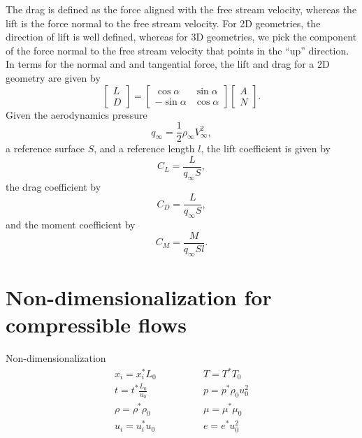 \documentclass[oneside,a4paper,11pt]{report}
\begin{document}
The drag is defined as the force aligned with the free stream velocity, whereas the lift is the force normal to the free stream velocity. For 2D geometries, the direction of lift is well defined, whereas for 3D geometries, we pick the component of the force normal to the free stream velocity that points in the ``up'' direction. In terms for the normal and and tangential force, the lift and drag for a 2D geometry are given by
\begin{equation}
    \begin{bmatrix} L \\ D \end{bmatrix} = 
    \begin{bmatrix} \cos \alpha & \sin \alpha \\ -\sin \alpha & \cos \alpha \end{bmatrix} \begin{bmatrix} A \\ N \end{bmatrix}.
\end{equation}
Given the aerodynamics pressure
\begin{equation}
    q_\infty = \frac{1}{2} \rho_\infty V^2_\infty,
\end{equation}
a reference surface $S$, and a reference length $l$, the lift coefficient is given by
\begin{equation}
    C_L = \frac{L}{q_\infty S},
\end{equation}
the drag coefficient by
\begin{equation}
    C_D = \frac{L}{q_\infty S},
\end{equation}
and the moment coefficient by
\begin{equation}
    C_M = \frac{M}{q_\infty Sl}.
\end{equation}

\chapter{Non-dimensionalization for compressible flows}
Non-dimensionalization
\begin{align}
x_i = x^*_i L_0 &\qquad \qquad T = T^* T_0 \nonumber \\
t = t^* \frac{L_0}{u_0} &\qquad \qquad p = p^* \rho_0 u^2_0 \nonumber \\
\rho = \rho^* \rho_0 &\qquad \qquad \mu = \mu^* \mu_0 \nonumber \\
u_i = u^*_i u_0 &\qquad \qquad e = e^* u_0^2
\end{align}
\end{document}
